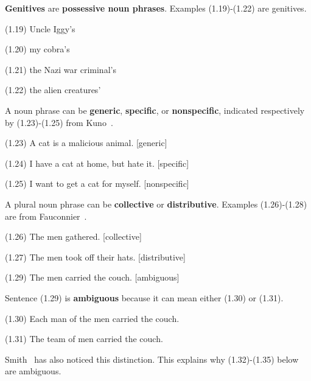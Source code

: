 \documentclass{article}
\begin{document}
\textbf{Genitives} are \textbf{possessive noun phrases}. Examples
(1.19)-(1.22) are genitives.

\begin{enumerate*}
\item[(1.19)] Uncle Iggy's
\item[(1.20)] my cobra's
\item[(1.21)] the Nazi war criminal's
\item[(1.22)] the alien creatures'
\end{enumerate*}

A noun phrase can be \textbf{generic}, \textbf{specific}, or
\textbf{nonspecific}, indicated respectively by (1.23)-(1.25)
from Kuno~\cite{Kuno74}.

\begin{enumerate*}
\item[(1.23)] A cat is a malicious animal. [generic]
\item[(1.24)] I have a cat at home, but hate it. [specific]
\item[(1.25)] I want to get a cat for myself. [nonspecific]
\end{enumerate*}

A plural noun phrase can be \textbf{collective} or
\textbf{distributive}.  Examples (1.26)-(1.28) are from
Fauconnier~\cite{Fauconnier75}.

\begin{enumerate*}
\item[(1.26)] The men gathered. [collective]
\item[(1.27)] The men took off their hats. [distributive]
\item[(1.29)] The men carried the couch. [ambiguous]
\end{enumerate*}

Sentence (1.29) is \textbf{ambiguous} because it can mean either
(1.30) or (1.31).

\begin{enumerate*}
\item[(1.30)] Each man of the men carried the couch.
\item[(1.31)] The team of men carried the couch.
\end{enumerate*}

Smith~\cite{Smith69} has also noticed this distinction. This
explains why (1.32)-(1.35) below are ambiguous.
\end{document}
